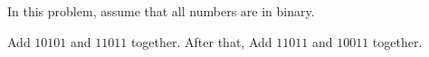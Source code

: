 In this problem, assume that all numbers are in binary.

Add $10101$ and $11011$ together. After that, Add $11011$ and $10011$ together.
